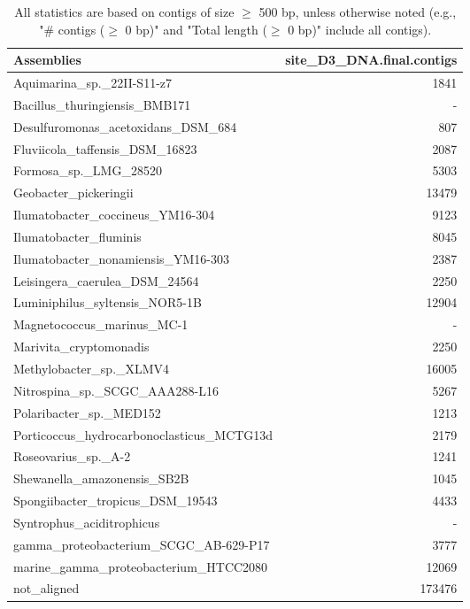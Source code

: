 \documentclass[12pt,a4paper]{article}
\begin{document}
\begin{table}[ht]
\begin{center}
\caption{All statistics are based on contigs of size $\geq$ 500 bp, unless otherwise noted (e.g., "\# contigs ($\geq$ 0 bp)" and "Total length ($\geq$ 0 bp)" include all contigs).}
\begin{tabular}{|l*{1}{|r}|}
\hline
Assemblies & site\_D3\_DNA.final.contigs \\ \hline
Aquimarina\_sp.\_22II-S11-z7 & 1841 \\ \hline
Bacillus\_thuringiensis\_BMB171 & - \\ \hline
Desulfuromonas\_acetoxidans\_DSM\_684 & 807 \\ \hline
Fluviicola\_taffensis\_DSM\_16823 & 2087 \\ \hline
Formosa\_sp.\_LMG\_28520 & 5303 \\ \hline
Geobacter\_pickeringii & 13479 \\ \hline
Ilumatobacter\_coccineus\_YM16-304 & 9123 \\ \hline
Ilumatobacter\_fluminis & 8045 \\ \hline
Ilumatobacter\_nonamiensis\_YM16-303 & 2387 \\ \hline
Leisingera\_caerulea\_DSM\_24564 & 2250 \\ \hline
Luminiphilus\_syltensis\_NOR5-1B & 12904 \\ \hline
Magnetococcus\_marinus\_MC-1 & - \\ \hline
Marivita\_cryptomonadis & 2250 \\ \hline
Methylobacter\_sp.\_XLMV4 & 16005 \\ \hline
Nitrospina\_sp.\_SCGC\_AAA288-L16 & 5267 \\ \hline
Polaribacter\_sp.\_MED152 & 1213 \\ \hline
Porticoccus\_hydrocarbonoclasticus\_MCTG13d & 2179 \\ \hline
Roseovarius\_sp.\_A-2 & 1241 \\ \hline
Shewanella\_amazonensis\_SB2B & 1045 \\ \hline
Spongiibacter\_tropicus\_DSM\_19543 & 4433 \\ \hline
Syntrophus\_aciditrophicus & - \\ \hline
gamma\_proteobacterium\_SCGC\_AB-629-P17 & 3777 \\ \hline
marine\_gamma\_proteobacterium\_HTCC2080 & 12069 \\ \hline
not\_aligned & 173476 \\ \hline
\end{tabular}
\end{center}
\end{table}
\end{document}
